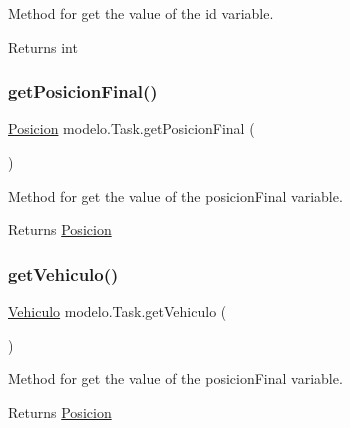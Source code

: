 Method for get the value of the id variable. 

\begin{DoxyReturn}{Returns}
int 
\end{DoxyReturn}
\mbox{\label{classmodelo_1_1_task_a98fe3bd9261ee8b560195c5256fbf4ec}} 
\subsubsection{\texorpdfstring{get\+Posicion\+Final()}{getPosicionFinal()}}
{\footnotesize\ttfamily \mbox{\hyperlink{classmodelo_1_1_posicion}{Posicion}} modelo.\+Task.\+get\+Posicion\+Final (\begin{DoxyParamCaption}{ }\end{DoxyParamCaption})}



Method for get the value of the posicion\+Final variable. 

\begin{DoxyReturn}{Returns}
\mbox{\hyperlink{classmodelo_1_1_posicion}{Posicion}} 
\end{DoxyReturn}
\mbox{\label{classmodelo_1_1_task_af3ec78e6405c7d5b912798d959b5a780}} 
\subsubsection{\texorpdfstring{get\+Vehiculo()}{getVehiculo()}}
{\footnotesize\ttfamily \mbox{\hyperlink{classmodelo_1_1_vehiculo}{Vehiculo}} modelo.\+Task.\+get\+Vehiculo (\begin{DoxyParamCaption}{ }\end{DoxyParamCaption})}



Method for get the value of the posicion\+Final variable. 

\begin{DoxyReturn}{Returns}
\mbox{\hyperlink{classmodelo_1_1_posicion}{Posicion}} 
\end{DoxyReturn}
\mbox{\label{classmodelo_1_1_task_af09ff21352cab3a8d0939e6d4251d673}} 
